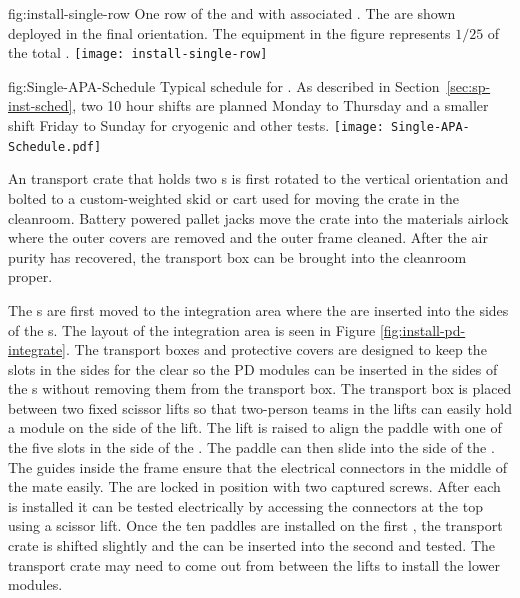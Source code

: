 \begin{dunefigure}{fig:install-single-row}
{One row of the  and  with associated . The  are shown deployed in the final orientation. The equipment in the figure represents $1/25$ of the total .}
 \texttt{[image: install-single-row]}
\end{dunefigure}

\begin{dunefigure}
{fig:Single-APA-Schedule}
{Typical  schedule for . As described in Section~\ref{sec:sp-inst-sched}, %
two 10 hour shifts are planned Monday to Thursday and a smaller shift Friday to Sunday for cryogenic and other tests. }
\texttt{[image: Single-APA-Schedule.pdf]}
\end{dunefigure}


  
An  transport crate that holds two s  is first rotated to the vertical orientation and bolted to a custom-weighted skid or cart used for moving the crate in the cleanroom. 
Battery powered pallet jacks move the crate into the materials airlock where the outer covers are removed and the outer frame cleaned. 
After the air purity has recovered, the transport box can be brought into the cleanroom proper. 

The s are first moved to the  integration area where the  are inserted into the sides of the s.
The layout of the  integration area is seen in Figure \ref{fig:install-pd-integrate}.
The  transport boxes and  protective covers are designed to keep the slots in the sides for the  clear so the PD modules can be inserted in the sides of the s without removing them from the transport box. 
The  transport box is placed between two fixed scissor lifts so that two-person teams in the lifts can easily hold a  module on the side of the lift. 
The lift is raised to align the paddle with one of the five slots in the side of the . The paddle can then slide into the side of the . 
The guides inside the  frame ensure that the electrical connectors in the middle of the  mate easily. 
The  are locked in position with two captured screws. 
After each  is installed it can be tested electrically by accessing the connectors at the top using a scissor lift. 
Once the ten  paddles are installed on the first , the transport crate is shifted slightly and the  can be inserted into the second  and tested. 
The  transport crate may need to come out from between the lifts to install the lower  modules.

